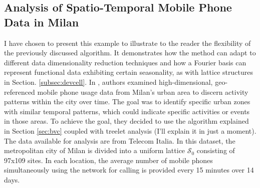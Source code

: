\subsection{Analysis of Spatio-Temporal Mobile Phone Data in Milan}
\label{subsec:mobilephonemilan}
I have chosen to present this example to illustrate to the reader the flexibility of the previously discussed algorithm. It demonstrates how the method can adapt to different data dimensionality reduction techniques and how a Fourier basis can represent functional data exhibiting certain seasonality, as with lattice structures in Section. \ref{subsec:devcell}.
In \citeauthor{secchi_analysis_2015} \citeyear{secchi_analysis_2015}, authors examined high-dimensional, geo-referenced mobile phone usage data from Milan's urban area to discern activity patterns within the city over time. The goal was to identify specific urban zones with similar temporal patterns, which could indicate specific activities or events in those areas. To achieve the goal, they decided to use the algorithm explained in Section \ref{sec:bvc} coupled with treelet analysis (I'll explain it in just a moment). 
The data available for analysis are from Telecom Italia. In this dataset, the metropolitan city of Milan is divided into a uniform lattice $\mathcal{S}_0$ consisting of 97x109 sites. In each location, the average number of mobile phones simultaneously using the network for calling is provided every 15 minutes over 14 days.



